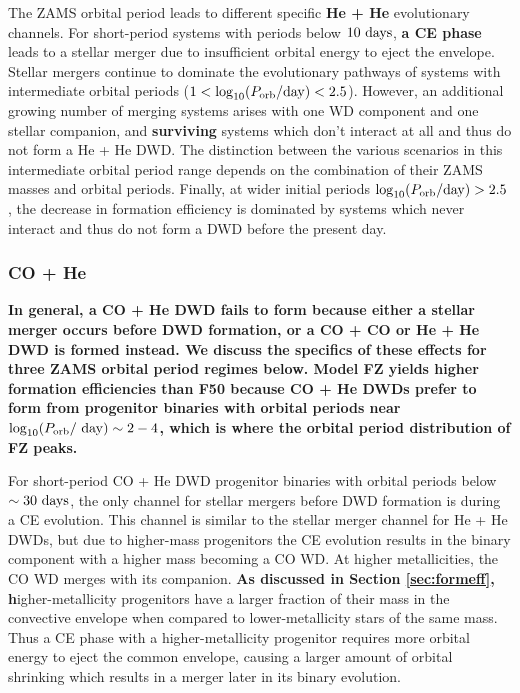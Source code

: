 \documentclass[twocolumn, linenumbers]{aastex631}
\begin{document}
The ZAMS orbital period leads to different specific \textbf{He + He} evolutionary channels. For short-period systems with periods below $10~\rm{days}$, \textbf{a CE phase} leads to a stellar merger due to insufficient orbital energy to eject the envelope. Stellar mergers continue to dominate the evolutionary pathways of systems with intermediate orbital periods ($1 < \log_{10}(P_{\rm{orb}}/\rm{day}) < 2.5$). However, an additional growing number of merging systems arises with one WD component and one stellar companion, and \textbf{surviving} systems which don't interact at all and thus do not form a He + He DWD. The distinction between the various scenarios in this intermediate orbital period range depends on the combination of their ZAMS masses and orbital periods. Finally, at wider initial periods \textbf{$\log_{10}(P_{\rm{orb}}/\rm{day}) > 2.5$}, the decrease in formation efficiency is dominated by systems which never interact and thus do not form a DWD before the present day.

\subsubsection{\textbf{CO + He}}\label{formeff_COHe}
\textbf{In general, a CO + He DWD fails to form because either a stellar merger occurs before DWD formation, or a CO + CO or He + He DWD is formed instead. We discuss the specifics of these effects for three ZAMS orbital period regimes below. Model FZ yields higher formation efficiencies than F50 because CO + He DWDs prefer to form from progenitor binaries with orbital periods near $\log_{10}(P_{\rm{orb}}/~\rm{day})\sim2-4$, which is where the orbital period distribution of FZ peaks.}

For short-period CO + He DWD progenitor binaries with orbital periods below $\sim30~\rm{days}$, the only channel for stellar mergers before DWD formation is during a CE evolution. This channel is similar to the stellar merger channel for He + He DWDs, but due to higher-mass progenitors the CE evolution results in the binary component with a higher mass becoming a CO WD. At higher metallicities, the CO WD merges with its companion. \textbf{As discussed in Section \ref{sec:formeff}, h}igher-metallicity progenitors have a larger fraction of their mass in the convective envelope when compared to lower-metallicity stars of the same mass. Thus a CE phase with a higher-metallicity progenitor requires more orbital energy to eject the common envelope, causing a larger amount of orbital shrinking which results in a merger later in its binary evolution.
\end{document}
